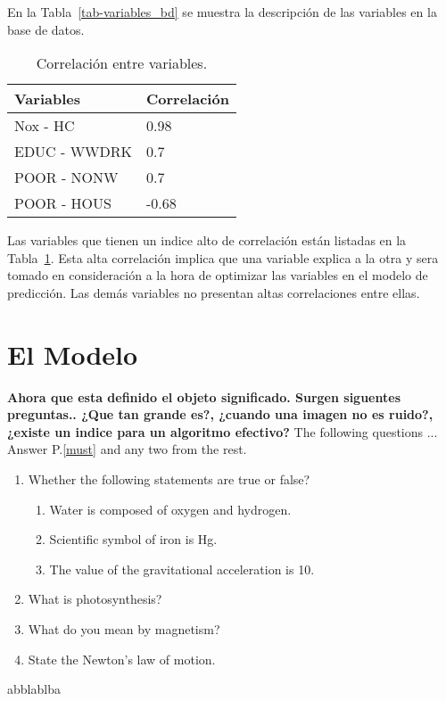 \documentclass[a4paper,12pt,twocolumn]{article}
\begin{document}
En la Tabla~\ref{tab-variables_bd} se muestra la descripción de las variables en la base de datos.\\

\begin{table}[!hbt]
\centering
\caption{Correlación entre variables.}
\label{tab-correlacion}
\begin{tabular}{|l|l|}
\hline Variables & Correlación\\
\hline Nox - HC & 0.98\\ 
\hline EDUC - WWDRK & 0.7\\ 
\hline POOR - NONW & 0.7\\ 
\hline POOR - HOUS & -0.68\\
\hline
\end{tabular}
\end{table}
%

Las variables que tienen un indice alto de correlación están listadas en la Tabla~\ref{tab-correlacion}. Esta alta correlación implica que una variable explica a la otra y sera tomado en consideración a la hora de optimizar las variables en el modelo de predicción. Las demás variables no presentan altas correlaciones entre ellas.\\

\section{El Modelo}
\textbf{Ahora que esta definido el objeto significado. Surgen siguentes preguntas.. ¿Que tan grande es?, ¿cuando una imagen  no es ruido?, ¿existe un indice para un algoritmo efectivo?}
The following questions ...\\ Answer P.\ref{must} and any two from the rest.
\begin{enumerate}
\item Whether the following statements are true or false?\label{must}
\begin{enumerate}
\item Water is composed of oxygen and hydrogen.
\item Scientific symbol of iron is Hg.
\item The value of the gravitational acceleration is 10.
\end{enumerate}
\item What is photosynthesis?
\item What do you mean by magnetism?
\item State the Newton’s law of motion.
\end{enumerate}
abblablba
\end{document}
